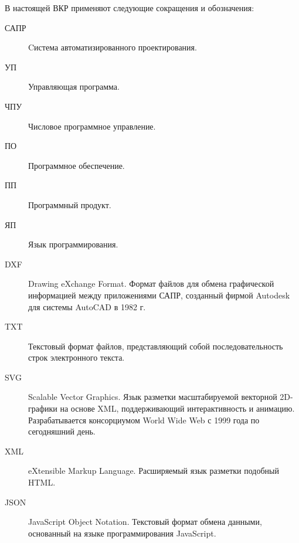 \Abbreviations %

В настоящей ВКР применяют следующие сокращения и обозначения:

\begin{description}
	
\item[САПР] Cистема автоматизированного проектирования.

\item[УП] Управляющая программа.

\item[ЧПУ] Числовое программное управление.

\item[ПО] Программное обеспечение.

\item[ПП] Программный продукт.

\item[ЯП] Язык программирования.

\item[DXF] Drawing eXchange Format. Формат файлов для обмена графической информацией между приложениями САПР, созданный фирмой Autodesk для системы AutoCAD в 1982 г.

\item[TXT] Текстовый формат файлов, представляющий собой последовательность строк электронного текста.

\item[SVG] Scalable Vector Graphics. Язык разметки масштабируемой векторной 2D-графики на основе XML, поддерживающий интерактивность и анимацию. Разрабатывается консорциумом World Wide Web с 1999 года по сегодняшний день.

\item[XML] eXtensible Markup Language. Расширяемый язык разметки подобный HTML.

\item[JSON] JavaScript Object Notation. Текстовый формат обмена данными, основанный на языке программирования JavaScript.

\end{description}

